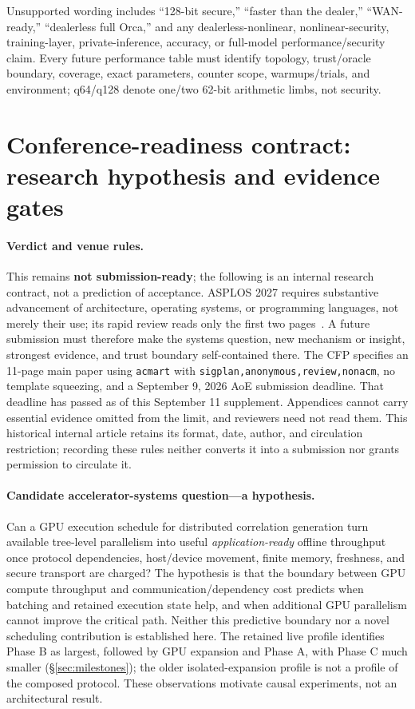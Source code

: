\documentclass[11pt]{article}
\begin{document}
Unsupported wording includes ``128-bit secure,'' ``faster than the dealer,''
``WAN-ready,'' ``dealerless full Orca,'' and any dealerless-nonlinear,
nonlinear-security, training-layer, private-inference, accuracy, or full-model
performance/security claim.
Every future performance table must identify topology, trust/oracle boundary,
coverage, exact parameters, counter scope, warmups/trials, and environment;
q64/q128 denote one/two 62-bit arithmetic limbs, not security.

\section{Conference-readiness contract: research hypothesis and evidence gates}
\label{sec:conference-readiness}

\paragraph{Verdict and venue rules.}
This remains \textbf{not submission-ready}; the following is an internal
research contract, not a prediction of acceptance. ASPLOS 2027 requires
substantive advancement of architecture, operating systems, or programming
languages, not merely their use; its rapid review reads only the first two
pages~\cite{asplos2027cfp}. A future submission must therefore make the
systems question, new mechanism or insight, strongest evidence, and trust
boundary self-contained there. The CFP specifies an 11-page main paper using
\texttt{acmart} with \texttt{sigplan,anonymous,review,nonacm}, no template
squeezing, and a September 9, 2026 AoE submission deadline. That deadline
has passed as of this September 11 supplement. Appendices cannot carry
essential evidence omitted from the limit, and reviewers need not read them.
This historical internal article retains its format, date, author, and
circulation restriction; recording these rules neither converts it into a
submission nor grants permission to circulate it.

\paragraph{Candidate accelerator-systems question---a hypothesis.}
Can a GPU execution schedule for distributed correlation generation turn
available tree-level parallelism into useful \emph{application-ready} offline
throughput once protocol dependencies, host/device movement, finite memory,
freshness, and secure transport are charged? The hypothesis is that the
boundary between GPU compute throughput and communication/dependency cost
predicts when batching and retained execution state help, and when additional
GPU parallelism cannot improve the critical path. Neither this predictive
boundary nor a novel scheduling contribution is established here. The retained
live profile identifies Phase B as largest, followed by GPU expansion and
Phase A, with Phase C much smaller (\S\ref{sec:milestones}); the older
isolated-expansion profile is not a profile of the composed protocol.
These observations motivate causal experiments, not an architectural result.
\end{document}
